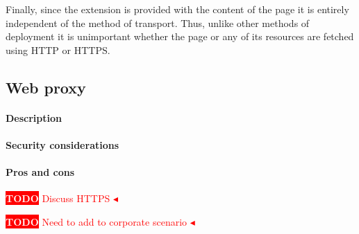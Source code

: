 \documentclass{llncs}
\newcommand{\todo}[1]{\colorbox{red}{\textcolor{white}{\sffamily\bfseries\scriptsize TODO}} \textcolor{red}{#1} \textcolor{red}{$\blacktriangleleft$}}
\begin{document}
Finally, since the extension is provided with the content of the page it is
entirely independent of the method of transport. Thus, unlike other methods of
deployment it is unimportant whether the page or any of its resources are
fetched using HTTP or HTTPS.



\subsection{Web proxy}

\paragraph{Description}

\paragraph{Security considerations}

\paragraph{Pros and cons}

\todo{Discuss HTTPS}



\todo{Need to add to corporate scenario}
\end{document}
